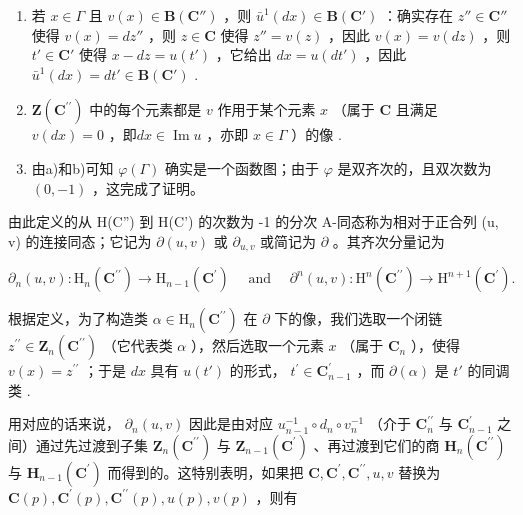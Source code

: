 \begin{enumerate}
\def\labelenumi{\alph{enumi})}
\item
  若 \(x \in \Gamma\) 且 \(v(x) \in \mathbf{B}(\mathbf{C}'')\) ，则 \(\bar{u}^1(dx) \in \mathbf{B}(\mathbf{C}')\) ：确实存在 \(z'' \in \mathbf{C}''\) 使得 \(v(x) = dz''\) ，则 \(z \in \mathbf{C}\) 使得 \(z'' = v(z)\) ，因此 \(v(x) = v(dz)\) ，则 \(t' \in \mathbf{C}'\) 使得 \(x - dz = u(t')\) ，它给出 \(dx = u(dt')\) ，因此 \(\bar{u}^1(dx) = dt' \in \mathbf{B}(\mathbf{C}')\) .
\item
  \(\mathbf{Z}(\mathbf{C}^{\prime \prime})\) 中的每个元素都是 \(v\) 作用于某个元素 \(x\) （属于 \(\mathbf{C}\) 且满足 \(v(dx) = 0\) ，即\(dx \in \operatorname{Im} u\) ，亦即 \(x \in \Gamma\) ）的像 .
\item
  由a)和b)可知 \(\varphi(\Gamma)\) 确实是一个函数图；由于 \(\varphi\) 是双齐次的，且双次数为 \((0, -1)\) ，这完成了证明。
\end{enumerate}

由此定义的从 H(C'') 到 H(C') 的次数为 -1 的分次 A-同态称为相对于正合列 (u, v) 的连接同态；它记为 \(\partial(u, v)\) 或 \(\partial_{u,v}\) 或简记为 \(\partial\) 。其齐次分量记为

\[
\partial_ {n} (u, v): \mathrm{H} _ {n} (\mathbf {C} ^ {\prime \prime}) \rightarrow \mathrm{H} _ {n - 1} (\mathbf {C} ^ {\prime}) \quad \text { and } \quad \partial^ {n} (u, v): \mathrm{H} ^ {n} (\mathbf {C} ^ {\prime \prime}) \rightarrow \mathrm{H} ^ {n + 1} (\mathbf {C} ^ {\prime}).
\]

根据定义，为了构造类 \(\alpha\in\mathrm{H}_{n}(\mathbf{C}^{\prime\prime})\) 在 \(\partial\) 下的像，我们选取一个闭链 \(z^{\prime\prime}\in\mathbf{Z}_{n}(\mathbf{C}^{\prime\prime})\) （它代表类 \(\alpha\) ），然后选取一个元素 \(x\) （属于 \(\mathbf{C}_{n}\) ），使得 \(v(x)=z^{\prime\prime}\) ；于是 \(dx\) 具有 \(u(t')\) 的形式， \(t^{\prime}\in\mathbf{C}_{n-1}^{\prime}\) ，而 \(\partial(\alpha)\) 是 \(t'\) 的同调类 .

用对应的话来说， \(\partial_{n}(u,v)\) 因此是由对应 \(u_{n-1}^{-1}\circ d_{n}\circ v_{n}^{-1}\) （介于 \(\mathbf{C}_{n}^{\prime\prime}\) 与 \(\mathbf{C}_{n-1}^{\prime}\) 之间）通过先过渡到子集 \(\mathbf{Z}_{n}(\mathbf{C}^{\prime\prime})\) 与 \(\mathbf{Z}_{n-1}(\mathbf{C}^{\prime})\) 、再过渡到它们的商 \(\mathbf{H}_{n}(\mathbf{C}^{\prime\prime})\) 与 \(\mathbf{H}_{n-1}(\mathbf{C}^{\prime})\) 而得到的。这特别表明，如果把 \(\mathbf{C},\mathbf{C}^{\prime},\mathbf{C}^{\prime\prime},u,v\) 替换为 \(\mathbf{C}(p),\mathbf{C}^{\prime}(p),\mathbf{C}^{\prime\prime}(p),u(p),v(p)\) ，则有

